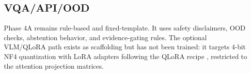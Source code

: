 \subsection{VQA/API/OOD}

Phase 4A remains rule-based and fixed-template. It uses safety disclaimers, OOD checks, abstention behavior, and evidence-gating rules. The optional VLM/QLoRA path exists as scaffolding but has not been trained: it targets 4-bit NF4 quantization with LoRA adapters \citep{hu2022lora} following the QLoRA recipe \citep{dettmers2023qlora}, restricted to the attention projection matrices.
